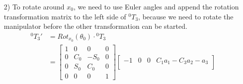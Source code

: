 \documentclass[a4paper,11pt]{article}
\begin{document}
\begin {enumerate}
\begin{enumerate}
\begin{align*}
        &= \begin{bmatrix} C_{1+2+3} & -S_{1+2+3} & 0 & C_{1+2+3}a_3 + C_{1+2}a_2+C_1a_1\\ S_{1+2+3} & C_{1+2+3} & 0 & S_{1+2+3}a_3 + S_{1+2}a_2 + S_1a_1\\ 0 & 0 & 1 & 0\\ 0 & 0 & 0 & 1 \end{bmatrix}
    \end{align*}

    Because the relation $\theta_1 + \theta_2 + \theta_3 = 180\degree$ is given, we can simplify the results. For $\cos(180\degree) = -1$ and $\sin(180\degree) = 0$:
        $${^0T_3} = \begin{bmatrix}
            -1 & 0 & 0 & -a_3 + C_{1+2}a_2+C_1a_1\\
            0 & -1 & 0 & S_{1+2}a_2 + S_1a_1\\
            0 & 0 & 1 & 0\\
            0 & 0 & 0 & 1
        \end{bmatrix}$$
    Furthermore, $\cos(\alpha) = -\cos(180\degree - \alpha)$ and $\sin(\alpha) = \sin(180\degree - \alpha)$ for $\alpha \in [0\degree, 180\degree]$. These facts result in the given transformation matrix:
        $${^0T_3} = \begin{bmatrix}
            -1 & 0 & 0 & C_1a_1 - C_{3}a_2 - a_3\\
            0 & -1 & 0 & S_1a_1 + S_{3}a_2\\
            0 & 0 & 1 & 0\\
            0 & 0 & 0 & 1
        \end{bmatrix}$$
        \item[2)] To rotate around $x_0$, we need to use Euler angles and append the rotation transformation matrix to the left side of ${^0T_3}$, because we need to rotate the manipulator before the other transformation can be started.
        \begin{align*}
            {^0T_3}' &= Rot_{x_0}(\theta_0) \cdot {^0T_3}\\
            &= \begin{bmatrix}
            1 & 0 & 0 & 0\\
            0 & C_0 & -S_0 & 0\\
            0 & S_0 & C_0 & 0\\
            0 & 0 & 0 & 1
        \end{bmatrix} \begin{bmatrix}
            -1 & 0 & 0 & C_1a_1 - C_{3}a_2 - a_3\\

\end{bmatrix}
\end{align*}
\end{enumerate}
\end{enumerate}
\end{document}
